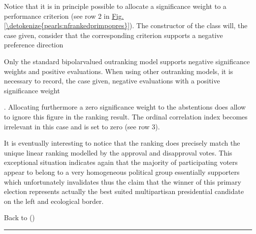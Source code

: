 \documentclass[a4paper,12pt,english]{sphinxhowto}
\begin{document}
\sphinxAtStartPar
Notice that it is in principle possible to allocate a  significance weight to a performance criterion (see row 2 in \hyperref[\detokenize{pearls:nfrankedprimpopres}]{Fig.\@ \ref{\detokenize{pearls:nfrankedprimpopres}}}). The constructor of the  class will, the case given, consider that the corresponding criterion supports a negative preference direction %
\begin{footnote}[11]\sphinxAtStartFootnote
Only the standard bipolar\sphinxhyphen{}valued outranking model supports negative significance weights and positive evaluations. When using other outranking models, it is necessary to record, the case given, negative evaluations with a positive significance weight
%
\end{footnote}. Allocating furthermore a zero significance weight to the abstentions does allow to ignore this figure in the ranking result. The ordinal correlation index becomes irrelevant in this case and is set to zero (see row 3).

\sphinxAtStartPar
It is eventually interesting to notice that the  ranking does precisely match the unique linear ranking modelled by the approval and disapproval votes. This exceptional situation indicates again that the majority of participating voters appear to belong to a very homogeneous political group \textendash{}essentially  supporters\textendash{} which unfortunately invalidates thus the claim that the winner of this primary election represents actually the best suited multipartisan presidential candidate on the left and ecological border.

\sphinxAtStartPar
Back to {\hyperref[\detokenize{pearls:pearls-label}]{}} ()


\bigskip\hrule\bigskip
\end{document}
